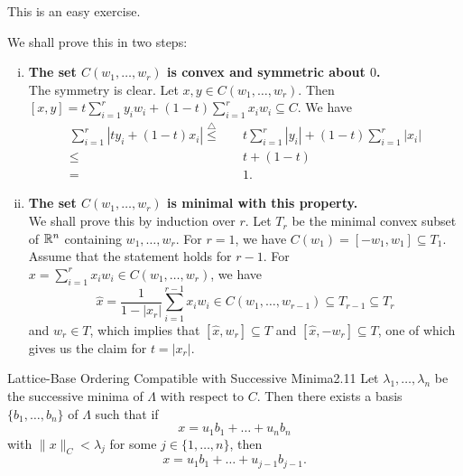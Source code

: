 \documentclass{Vorlesungstemplate_English} %
\begin{document}
    \begin{pf}
      This is an easy exercise. \\
      {\color{blue} We shall prove this in two steps:
      \begin{enumerate}[(i)]
        \item{\textbf{The set $C(w_1, \dots, w_r)$ is convex and symmetric about $0$.} \\
        The symmetry is clear. Let $x,y \in C(w_1, \dots, w_r)$. Then $[x,y] = t\sum_{i=1}^ry_iw_i + (1-t)\sum_{i=1}^rx_iw_i \subseteq C$. We have
        \begin{align*}
          \sum_{i=1}^r |ty_i+(1-t)x_i| \stackrel{\triangle}{\leq} \quad & t\sum_{i=1}^r|y_i| + (1-t)\sum_{i=1}^r|x_i| \\
          \leq \quad & t+(1-t) \\
          = \quad & 1.
        \end{align*}}
        \item{\textbf{The set $C(w_1, \dots, w_r)$ is minimal with this property.} \\
        We shall prove this by induction over $r$. Let $T_r$ be the minimal convex subset of $\mathbb{R}^n$ containing $w_1, \dots, w_r$. For $r=1$, we have $C(w_1) = [-w_1, w_1] \subseteq T_1$. Assume that the statement holds for $r-1$. For $x = \sum_{i=1}^rx_iw_i \in C(w_1, \dots, w_r)$, we have
        \[ \widehat{x} = \frac{1}{1-|x_r|}\sum_{i=1}^{r-1} x_iw_i \in C(w_1, \dots, w_{r-1}) \subseteq T_{r-1} \subseteq T_r\]
        and $w_r \in T$, which implies that $[\widehat{x}, w_r] \subseteq T$ and $[\widehat{x}, -w_r] \subseteq T$, one of which gives us the claim for $t=|x_r|$. \qedhere}
      \end{enumerate}}
    \end{pf}
    \begin{lemma}{Lattice-Base Ordering Compatible with Successive Minima}{2.11}
      Let $\lambda_1, \dots, \lambda_n$ be the successive minima of $\Lambda$ with respect to $C$. Then there exists a basis $\{ b_1, \dots, b_n\}$ of $\Lambda$ such that if
      \[ x = u_1b_1+\dots+u_nb_n\]
      with $\|x\|_C < \lambda_j$ for some $j \in \{ 1, \dots, n\}$, then
      \[ x = u_1b_1+\dots+u_{j-1}b_{j-1}.\]
    \end{lemma}
\end{document}
